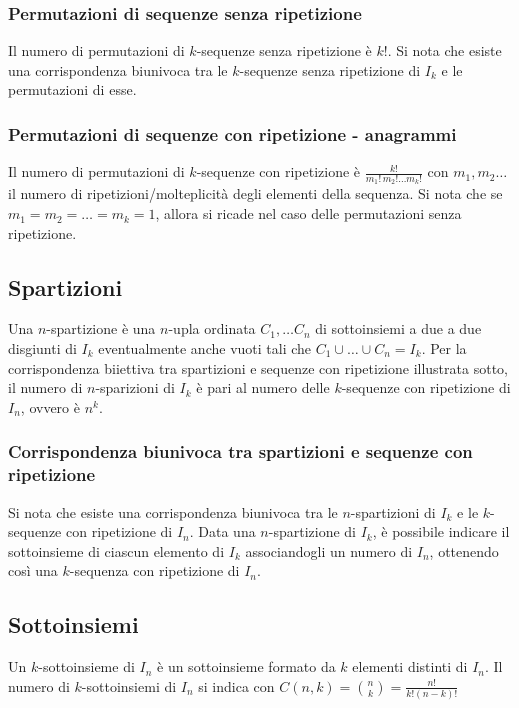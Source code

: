 \documentclass[a4paper]{article}
\begin{document}
\subsubsection*{Permutazioni di sequenze senza ripetizione}
Il numero di permutazioni di \(k\)-sequenze senza ripetizione è \(k!\). Si nota che esiste una corrispondenza biunivoca tra le
\(k\)-sequenze senza ripetizione di \(I_k\) e le permutazioni di esse.

\subsubsection*{Permutazioni di sequenze con ripetizione - anagrammi}
Il numero di permutazioni di \(k\)-sequenze con ripetizione è \(\frac{k!}{m_1 \!! \, m_2\!! \dots m_k\!!}\) con \(m_1, m_2\dots\)
il numero di ripetizioni/molteplicità degli elementi della sequenza. Si nota che se \(m_1 = m_2 = \dots = m_k = 1\), allora si
ricade nel caso delle permutazioni senza ripetizione.

\subsection{Spartizioni}
Una \(n\)-spartizione è una \(n\)-upla ordinata \(C_1, \dots C_n\) di sottoinsiemi a due a due disgiunti di \(I_k\) eventualmente
anche vuoti tali che \(C_1 \cup \dots \cup C_n = I_k\). Per la corrispondenza biiettiva tra spartizioni e sequenze con ripetizione
illustrata sotto, il numero di \(n\)-sparizioni di \(I_k\) è pari al numero delle \(k\)-sequenze con ripetizione di \(I_n\), ovvero
è \(n^k\).

\subsubsection*{Corrispondenza biunivoca tra spartizioni e sequenze con ripetizione}
Si nota che esiste una corrispondenza biunivoca tra le \(n\)-spartizioni di \(I_k\) e le \(k\)-sequenze con ripetizione di \(I_n\).
Data una \(n\)-spartizione di \(I_k\), è possibile indicare il sottoinsieme di ciascun elemento di \(I_k\) associandogli un numero
di \(I_n\), ottenendo così una \(k\)-sequenza con ripetizione di \(I_n\).

\subsection{Sottoinsiemi}
Un \(k\)-sottoinsieme di \(I_n\) è un sottoinsieme formato da \(k\) elementi distinti di \(I_n\). Il numero di \(k\)-sottoinsiemi
di \(I_n\) si indica con \(\displaystyle C(n,k) = \binom{n}{k} = \frac{n!}{k! (n-k)!}\)
\end{document}
